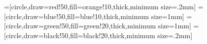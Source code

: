 =[circle,draw=red!50,fill=orange!10,thick,minimum size=.2mm]
=[circle,draw=blue!50,fill=blue!10,thick,minimum size=1mm]
=[circle,draw=green!50,fill=green!20,thick,minimum size=1mm]
=[circle,draw=black!50,fill=black!20,thick,minimum size=.2mm]

